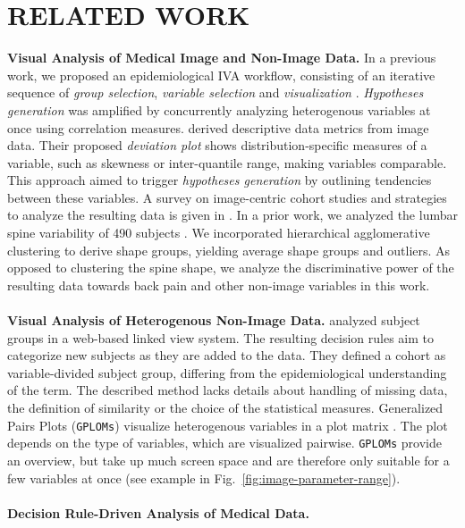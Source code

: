\documentclass[a4paper,twoside]{style/article}
\begin{document}
\section{\uppercase{Related Work}}
\label{sec:RelatedWork}
\noindent \textbf{Visual Analysis of Medical Image and Non-Image Data.}
In a previous work, we proposed an epidemiological IVA workflow, consisting of an iterative sequence of \emph{group selection}, \emph{variable selection} and \emph{visualization} \cite{Klemm2014VIS}.
\emph{Hypotheses generation} was amplified by concurrently analyzing heterogenous variables at once using correlation measures.
\cite{Turkay} derived descriptive data metrics from image data.
Their proposed \emph{deviation plot} shows distribution-specific measures of a variable, such as skewness or inter-quantile range, making variables comparable.
This approach aimed to trigger \emph{hypotheses generation} by outlining tendencies between these variables.
A survey on image-centric cohort studies and strategies to analyze the resulting data is given in \cite{Preim2015}.
In a prior work, we analyzed the lumbar spine variability of 490 subjects \cite{Klemm2013VMV}.
We incorporated hierarchical agglomerative clustering to derive shape groups, yielding average shape groups and outliers.
As opposed to clustering the spine shape, we analyze the discriminative power of the resulting data towards back pain and other non-image variables in this work.
\\\\
\noindent \textbf{Visual Analysis of Heterogenous Non-Image Data.}
\cite{Zhang} analyzed subject groups in a web-based linked view system.
The resulting decision rules aim to categorize new subjects as they are added to the data.
They defined a cohort as variable-divided subject group, differing from the epidemiological understanding of the term.
The described method lacks details about handling of missing data, the definition of similarity or the choice of the statistical measures.
Generalized Pairs Plots (\texttt{GPLOMs}) visualize heterogenous variables in a plot matrix \cite{GPLOMS}. %
The plot depends on the type of variables, which are visualized pairwise.
\texttt{GPLOMs} provide an overview, but take up much screen space and are therefore only suitable for a few variables at once (see example in Fig.~\ref{fig:image-parameter-range}).
\\\\
\noindent \textbf{Decision Rule-Driven Analysis of Medical Data.}
\end{document}
